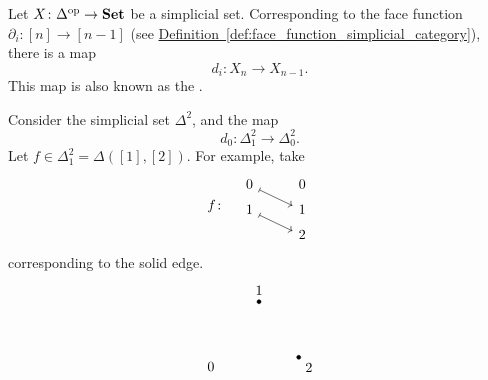 \documentclass[main.tex]{subfiles}
\begin{document}
\begin{definition}
  \label{def:face_map}
  Let $X\colon \Delta^{\mathrm{op}} \to \mathbf{Set}$ be a simplicial set. Corresponding to the face function $\partial_{i}\colon [n] \to [n-1]$ (see \hyperref[def:face_function_simplicial_category]{Definition~\ref*{def:face_function_simplicial_category}}), there is a map
  \begin{equation*}
    d_{i}\colon X_{n} \to X_{n-1}.
  \end{equation*}
  This map is also known as the .
\end{definition}
\begin{example}
  Consider the simplicial set $\Delta^{2}$, and the map
  \begin{equation*}
    d_{0}\colon \Delta^{2}_{1} \to \Delta^{2}_{0}.
  \end{equation*}
  Let $f \in \Delta^{2}_{1} = \Delta([1], [2])$. For example, take
  \begin{equation*}
    f\colon\quad
    \begin{tikzcd}[row sep=tiny]
      0
      \arrow[mapsto, dr]
      & 0
      \\
      1
      \arrow[mapsto, rd]
      & 1
      \\
      & 2
    \end{tikzcd}
  \end{equation*}
  corresponding to the solid edge.
  \begin{equation*}
    \begin{tikzpicture}[dot/.style={draw,circle,minimum size=1mm,inner sep=0pt,outer sep=0pt,fill=black}, scale=2]
      \coordinate[label=210:0] (0) at (0,0);
      \coordinate[draw, dot, label=90:1] (1) at (0.5,0.7);
      \coordinate[draw, dot, label=-30:2] (2) at (1,0);


\end{tikzpicture}
\end{equation*}
\end{example}
\end{document}
